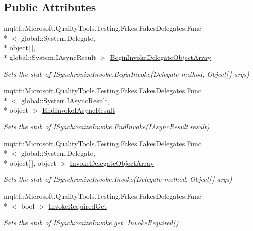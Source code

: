 \subsection*{Public Attributes}
\begin{DoxyCompactItemize}
\item 
mqttf\-::\-Microsoft.\-Quality\-Tools.\-Testing.\-Fakes.\-Fakes\-Delegates.\-Func\\*
$<$ global\-::\-System.\-Delegate, \\*
object\mbox{[}$\,$\mbox{]}, \\*
global\-::\-System.\-I\-Async\-Result $>$ \hyperlink{class_system_1_1_component_model_1_1_fakes_1_1_stub_i_synchronize_invoke_a755e69064ede837ad41cec615b90ea1f}{Begin\-Invoke\-Delegate\-Object\-Array}
\begin{DoxyCompactList}\small\item\em Sets the stub of I\-Synchronize\-Invoke.\-Begin\-Invoke(\-Delegate method, Object\mbox{[}$\,$\mbox{]} args)\end{DoxyCompactList}\item 
mqttf\-::\-Microsoft.\-Quality\-Tools.\-Testing.\-Fakes.\-Fakes\-Delegates.\-Func\\*
$<$ global\-::\-System.\-I\-Async\-Result, \\*
object $>$ \hyperlink{class_system_1_1_component_model_1_1_fakes_1_1_stub_i_synchronize_invoke_a8367484e36638b43ac6f169ab5cdc4ae}{End\-Invoke\-I\-Async\-Result}
\begin{DoxyCompactList}\small\item\em Sets the stub of I\-Synchronize\-Invoke.\-End\-Invoke(\-I\-Async\-Result result)\end{DoxyCompactList}\item 
mqttf\-::\-Microsoft.\-Quality\-Tools.\-Testing.\-Fakes.\-Fakes\-Delegates.\-Func\\*
$<$ global\-::\-System.\-Delegate, \\*
object\mbox{[}$\,$\mbox{]}, object $>$ \hyperlink{class_system_1_1_component_model_1_1_fakes_1_1_stub_i_synchronize_invoke_afb0861c9fc9e31ba1af3f782405248e8}{Invoke\-Delegate\-Object\-Array}
\begin{DoxyCompactList}\small\item\em Sets the stub of I\-Synchronize\-Invoke.\-Invoke(\-Delegate method, Object\mbox{[}$\,$\mbox{]} args)\end{DoxyCompactList}\item 
mqttf\-::\-Microsoft.\-Quality\-Tools.\-Testing.\-Fakes.\-Fakes\-Delegates.\-Func\\*
$<$ bool $>$ \hyperlink{class_system_1_1_component_model_1_1_fakes_1_1_stub_i_synchronize_invoke_a315fd3346402af02a27bda3a41e71a44}{Invoke\-Required\-Get}
\begin{DoxyCompactList}\small\item\em Sets the stub of I\-Synchronize\-Invoke.\-get\-\_\-\-Invoke\-Required()\end{DoxyCompactList}\end{DoxyCompactItemize}


